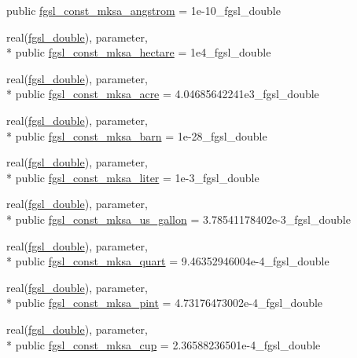 \begin{DoxyCompactItemize}
public \hyperlink{classfgsl_ae348f6545928612e5e56ed4174d31875}{fgsl\-\_\-const\-\_\-mksa\-\_\-angstrom} = 1e-\/10\-\_\-fgsl\-\_\-double
\item 
real(\hyperlink{classfgsl_a9af5113378e0f000eb479d3f90196ddf}{fgsl\-\_\-double}), parameter, \\*
public \hyperlink{classfgsl_a62efb1288447e01349bbf38c21b82e70}{fgsl\-\_\-const\-\_\-mksa\-\_\-hectare} = 1e4\-\_\-fgsl\-\_\-double
\item 
real(\hyperlink{classfgsl_a9af5113378e0f000eb479d3f90196ddf}{fgsl\-\_\-double}), parameter, \\*
public \hyperlink{classfgsl_a58e85d8e8be547abd415a03ac8cfe6d9}{fgsl\-\_\-const\-\_\-mksa\-\_\-acre} = 4.\-04685642241e3\-\_\-fgsl\-\_\-double
\item 
real(\hyperlink{classfgsl_a9af5113378e0f000eb479d3f90196ddf}{fgsl\-\_\-double}), parameter, \\*
public \hyperlink{classfgsl_a859c8ea83a5175d31bc4240282c2b0b4}{fgsl\-\_\-const\-\_\-mksa\-\_\-barn} = 1e-\/28\-\_\-fgsl\-\_\-double
\item 
real(\hyperlink{classfgsl_a9af5113378e0f000eb479d3f90196ddf}{fgsl\-\_\-double}), parameter, \\*
public \hyperlink{classfgsl_ac989bb9124679e7e571cef06c81e5fe3}{fgsl\-\_\-const\-\_\-mksa\-\_\-liter} = 1e-\/3\-\_\-fgsl\-\_\-double
\item 
real(\hyperlink{classfgsl_a9af5113378e0f000eb479d3f90196ddf}{fgsl\-\_\-double}), parameter, \\*
public \hyperlink{classfgsl_a9c8e297dc4a0fa63d97e1c130cc5248a}{fgsl\-\_\-const\-\_\-mksa\-\_\-us\-\_\-gallon} = 3.\-78541178402e-\/3\-\_\-fgsl\-\_\-double
\item 
real(\hyperlink{classfgsl_a9af5113378e0f000eb479d3f90196ddf}{fgsl\-\_\-double}), parameter, \\*
public \hyperlink{classfgsl_a30b92280c9a587dcda6d603b6c737fc3}{fgsl\-\_\-const\-\_\-mksa\-\_\-quart} = 9.\-46352946004e-\/4\-\_\-fgsl\-\_\-double
\item 
real(\hyperlink{classfgsl_a9af5113378e0f000eb479d3f90196ddf}{fgsl\-\_\-double}), parameter, \\*
public \hyperlink{classfgsl_a11b62fc3ced19e2c4f1ad227de09f9f0}{fgsl\-\_\-const\-\_\-mksa\-\_\-pint} = 4.\-73176473002e-\/4\-\_\-fgsl\-\_\-double
\item 
real(\hyperlink{classfgsl_a9af5113378e0f000eb479d3f90196ddf}{fgsl\-\_\-double}), parameter, \\*
public \hyperlink{classfgsl_af7eed4749b386e3a913ae8e18cadc2bc}{fgsl\-\_\-const\-\_\-mksa\-\_\-cup} = 2.\-36588236501e-\/4\-\_\-fgsl\-\_\-double

\end{DoxyCompactItemize}
